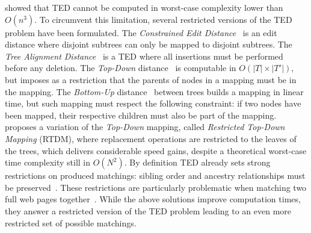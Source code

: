 \cite{bringmann2018tree} showed that TED cannot be computed in worst-case complexity lower than $O(n^3)$.
To circumvent this limitation, several restricted versions of the TED problem have been formulated.
The \textit{Constrained Edit Distance}~\cite{zhang1995algorithms, zhang1996constrained} is an edit distance where disjoint subtrees can only be mapped to disjoint subtrees.
The \textit{Tree Alignment Distance}~\cite{jiang1994alignment} is a TED where all insertions must be performed before any deletion.
The \textit{Top-Down} distance~\cite{selkow1977tree} is computable in $O(|T|\times|T'|)$, but imposes as a restriction that the parents of nodes in a mapping must be in the mapping.
The \textit{Bottom-Up} distance~\cite{valiente2001efficient} between trees builds a mapping in linear time, but such mapping must respect the following constraint: if two nodes have been mapped, their respective children must also be part of the mapping.
\cite{reis2004automatic} proposes a variation of the \textit{Top-Down} mapping, called \textit{Restricted Top-Down Mapping} (RTDM), where replacement operations are restricted to the leaves of the trees, which delivers considerable speed gains, despite a theoretical worst-case time complexity still in $O(N^2)$.
By definition TED already sets strong restrictions on produced matchings: sibling order and ancestry relationships must be preserved~\cite{zhang1995algorithms}.
These restrictions are particularly problematic when matching two full web pages together~\cite{Kumar2011_Bricolage}.
While the above solutions improve computation times, they answer a restricted version of the TED problem leading to an even more restricted set of possible matchings.

